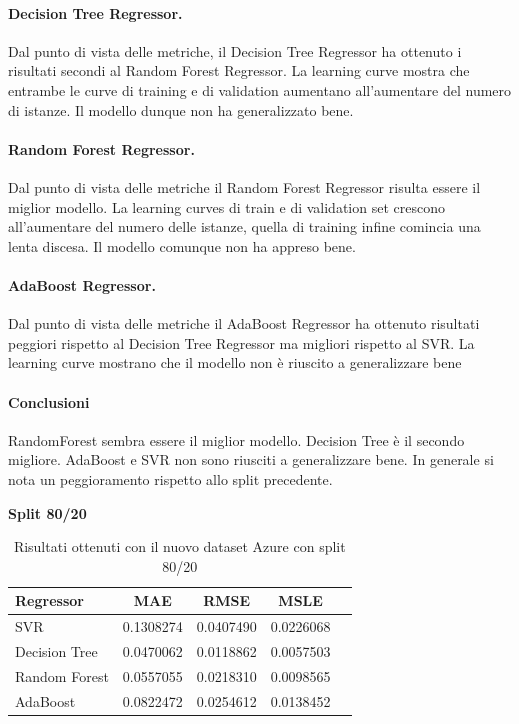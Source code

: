 \paragraph{\textbf{Decision Tree Regressor}.}
Dal punto di vista delle metriche, il Decision Tree Regressor ha ottenuto i risultati secondi al Random Forest Regressor. 
La learning curve mostra che entrambe le curve di training e di validation aumentano all'aumentare del numero di istanze. Il modello dunque non ha generalizzato bene.
\paragraph{\textbf{Random Forest Regressor}.}
Dal punto di vista delle metriche il Random Forest Regressor risulta essere il miglior modello.
La learning curves di train e di validation set crescono all'aumentare del numero delle istanze, quella di training infine comincia una lenta discesa. Il modello comunque non ha appreso bene.
\paragraph{\textbf{AdaBoost Regressor}.}
Dal punto di vista delle metriche il AdaBoost Regressor ha ottenuto risultati peggiori rispetto al Decision Tree Regressor ma migliori rispetto al SVR.
La learning curve mostrano che il modello non è riuscito a generalizzare bene

\paragraph{\textbf{Conclusioni}} RandomForest sembra essere il miglior modello. Decision Tree è il secondo migliore. AdaBoost e SVR non sono riusciti a generalizzare bene. In generale si nota un peggioramento rispetto allo split precedente.


\noindent\textbf{Split 80/20}

\begin{table}[H]
    \centering
    \begin{tabular}{|>{\centering\arraybackslash}m{5cm}|c|c|c|c|}
        \hline
        \textbf{Regressor} & \textbf{MAE} & \textbf{RMSE} & \textbf{MSLE} \\ [10pt]
        \hline
        SVR & 0.1308274 & 0.0407490 & 0.0226068 \\ [10pt]
        \hline
        Decision Tree & 0.0470062 & 0.0118862 & 0.0057503 \\ [10pt]
        \hline
        Random Forest & 0.0557055 & 0.0218310 & 0.0098565 \\ [10pt]
        \hline
        AdaBoost & 0.0822472 & 0.0254612 & 0.0138452 \\ [10pt]
        \hline
    \end{tabular}
    \caption{Risultati ottenuti con il nuovo dataset Azure con split 80/20}
    \label{tab:results}
\end{table}

